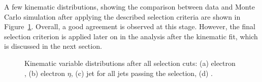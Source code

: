 A few kinematic distributions, showing the comparison between data and Monte Carlo simulation after applying the
described selection criteria are shown in Figure~\ref{fig:controlplots}. Overall, a good agreement is observed at this
stage. However, the final selection criterion is applied later on in the analysis after the kinematic fit, which is
discussed in the next section.

\begin{figure}[!htp]
   \centering
   \hfill
   \caption[Kinematic variable distributions after all selection cuts]{Kinematic variable distributions after all
   selection cuts: (a) electron \pt, (b) electron $\eta$, (c) jet \pt for all jets passing the selection, (d) \MET.}
   \label{fig:controlplots}
\end{figure}

